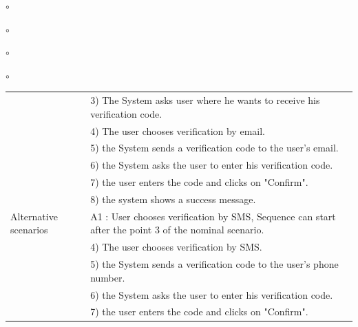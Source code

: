\documentclass[]{uc2pfecaneva}
\begin{document}
\begin{list}{$\circ$}{}
\begin{list}{$\circ$}{}
\begin{list}{$\circ$}{}
\begin{list}{$\circ$}{}
\begin{table}[h]
\begin{tabularx}{\textwidth}{|l|X|}
            & 3) The System asks user where he wants to receive his verification code.                                                                                             \\
            & 4) The user chooses verification by email.                                                                                                                           \\
            & 5) the System sends a verification code to the user's email.                                                                                                         \\
            & 6) the System asks the user to enter his verification code.                                                                                                          \\
            & 7) the user enters the code and clicks on "Confirm".                                                                                                                 \\
            & 8) the system shows a success message.                                                                                                                               \\ \hline
            Alternative scenarios
            & A1 : User chooses verification by SMS,  Sequence can start after the point 3 of the nominal scenario.                                                                \\
            & \hspace{4mm}4) The user chooses verification by SMS.                                                                                                               \\
            & \hspace{4mm}5) the System sends a verification code to the user's phone number.                                                                                    \\
            & \hspace{4mm}6) the System asks the user to enter his verification code.                                                                                            \\
            & \hspace{4mm}7) the user enters the code and clicks on "Confirm".                                                                                                   \\

\end{tabularx}
\end{table}
\end{list}
\end{list}
\end{list}
\end{list}
\end{document}
